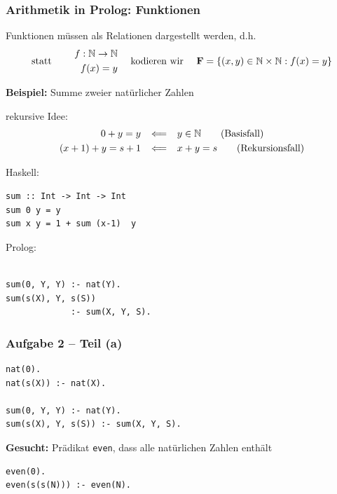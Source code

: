 \documentclass{beamer}
\newcommand{\operator}[1]{\textbf{\textcolor{black}{#1}}}
\begin{document}
\begin{frame}[fragile] \frametitle{Arithmetik in Prolog: Funktionen}
	\footnotesize
	
	Funktionen müssen als Relationen dargestellt werden, d.h. 
	\begin{align*}
		\text{statt } \qquad
		\begin{aligned}
			f : \N \to \N \\
			f(x) = y
		\end{aligned}
		\quad
		\text{ kodieren wir }
		\quad \operator{F} = \menge{(x,y) \in \N \times \N : f(x) = y }
	\end{align*}
	\pause
	
	\textbf{Beispiel:} Summe zweier natürlicher Zahlen
	
	rekursive Idee:
	\begin{align*}
		0 + y = y \enskip &\impliedby \enskip y \in \mathbb{N} \tag{Basisfall} \\
		(x+1) + y = s+1 \enskip &\impliedby \enskip x + y = s \tag{Rekursionsfall}
	\end{align*}
	\pause
	
	\begin{minipage}[t]{\dimexpr0.5\linewidth-\fboxrule-\fboxsep}
		Haskell:
		\begin{lstlisting}[basicstyle=\ttfamily\scriptsize, frame=l]
sum :: Int -> Int -> Int
sum 0 y = y
sum x y = 1 + sum (x-1)  y
		\end{lstlisting}
	\end{minipage}
	\begin{minipage}[t]{\dimexpr0.5\linewidth-\fboxrule-\fboxsep}
		Prolog:
		\begin{lstlisting}[basicstyle=\ttfamily\scriptsize, frame=l]
			
sum(0, Y, Y) :- nat(Y).
sum(s(X), Y, s(S)) 
             :- sum(X, Y, S).
		\end{lstlisting}
	\end{minipage}
\end{frame}

\begin{frame}[fragile] \frametitle{Aufgabe 2 -- Teil (a)}
	\footnotesize
	\begin{lstlisting}
nat(0).
nat(s(X)) :- nat(X).

sum(0, Y, Y) :- nat(Y).
sum(s(X), Y, s(S)) :- sum(X, Y, S).
	\end{lstlisting}
	
	\textbf{Gesucht:} Prädikat \texttt{even}, dass alle natürlichen Zahlen enthält
	
	\pause
	
	\begin{lstlisting}[firstnumber=7]
even(0).
even(s(s(N))) :- even(N).
	\end{lstlisting}
\end{frame}
\end{document}
